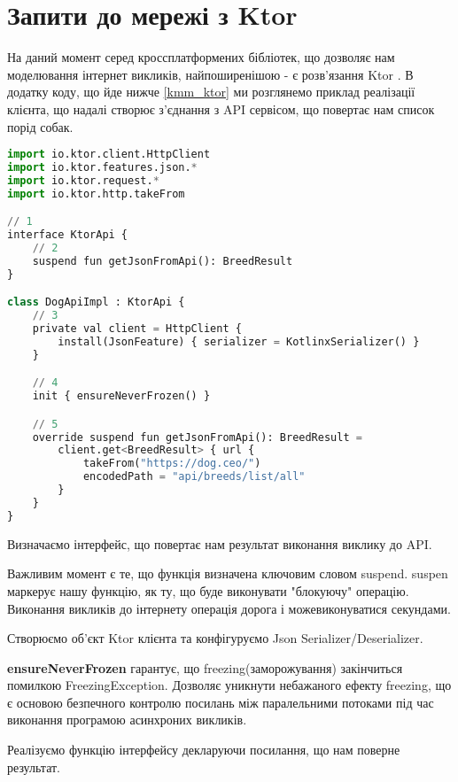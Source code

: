 \section{Запити до мережі з Ktor}
\label{section.2.10}
На даний момент серед кроссплатформених бібліотек, що дозволяє нам моделювання інтернет викликів, найпоширенішою - є розв'язання Ktor \cite{ktor_home_page}.
В додатку коду, що йде нижче \ref{kmm_ktor} ми розглянемо приклад реалізації клієнта, що надалі створює з'єднання з API сервісом, що повертає нам список порід собак.

\begin{lstlisting}[style=light, language=Python,label={lst:kmm_ktor},caption=Ktor]
import io.ktor.client.HttpClient
import io.ktor.features.json.*
import io.ktor.request.*
import io.ktor.http.takeFrom

// 1
interface KtorApi {
    // 2
    suspend fun getJsonFromApi(): BreedResult
}

class DogApiImpl : KtorApi {
    // 3
    private val client = HttpClient {
        install(JsonFeature) { serializer = KotlinxSerializer() }
    }

    // 4
    init { ensureNeverFrozen() }

    // 5
    override suspend fun getJsonFromApi(): BreedResult =
        client.get<BreedResult> { url {
            takeFrom("https://dog.ceo/")
            encodedPath = "api/breeds/list/all"
        }
    }
}
\end{lstlisting}

\begin{enumerate}
    \begin{item}
        Визначаємо інтерфейс, що повертає нам результат виконання виклику до API.
    \end{item}

    \begin{item}
        Важливим момент є те, що функція визначена ключовим словом suspend.
        suspen маркерує нашу функцію, як ту, що буде виконувати "блокуючу" операцію.
        Виконання викликів до інтернету операція дорога і можевиконуватися секундами.
    \end{item}

    \begin{item}
        Створюємо об'єкт Ktor клієнта та конфігуруємо Json Serializer/Deserializer.
    \end{item}

    \begin{item}
        \textbf{ensureNeverFrozen} гарантує, що freezing(заморожування) закінчиться помилкою FreezingException.
        Дозволяє уникнути небажаного ефекту freezing, що є основою безпечного контролю посилань між паралельними потоками
        під час виконання програмою асинхроних викликів.
    \end{item}

    \begin{item}
        Реалізуємо функцію інтерфейсу декларуючи посилання, що нам поверне результат.
    \end{item}

\end{enumerate}


